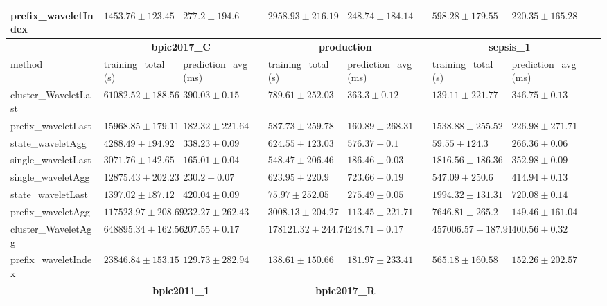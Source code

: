 \begin{table}[!htbp]
{\begin{tabular}{llllllll}
			prefix\_waveletIndex & $1453.76 \pm 123.45$ & $277.2 \pm 194.6$ & $2958.93 \pm 216.19$ & $248.74 \pm 184.14$ & $598.28 \pm 179.55$ & $220.35 \pm 165.28$ \\ 
			\bottomrule
			\toprule
			& \multicolumn{2}{c}{{\bfseries bpic2017\_C}} & \multicolumn{2}{c}{{\bfseries production}} & \multicolumn{2}{c}{{\bfseries sepsis\_1}} \\ \cmidrule(lr){2-3} \cmidrule(lr){4-5} \cmidrule(lr){6-7}
			method  & training\_total (s) & prediction\_avg (ms) & training\_total (s) & prediction\_avg (ms) & training\_total (s) & prediction\_avg (ms) \\ \midrule
			cluster\_WaveletLast & $61082.52 \pm 188.56$ & $390.03 \pm 0.15$ & $789.61 \pm 252.03$ & $363.3 \pm 0.12$ & $139.11 \pm 221.77$ & $346.75 \pm 0.13$ \\ 
			prefix\_waveletLast & $15968.85 \pm 179.11$ & $182.32 \pm 221.64$ & $587.73 \pm 259.78$ & $160.89 \pm 268.31$ & $1538.88 \pm 255.52$ & $226.98 \pm 271.71$ \\ 
			state\_waveletAgg & $4288.49 \pm 194.92$ & $338.23 \pm 0.09$ & $624.55 \pm 123.03$ & $576.37 \pm 0.1$ & $\mathbf{59.55 \pm 124.3}$ & $266.36 \pm 0.06$ \\ 
			single\_waveletLast & $3071.76 \pm 142.65$ & $165.01 \pm 0.04$ & $548.47 \pm 206.46$ & $186.46 \pm 0.03$ & $1816.56 \pm 186.36$ & $352.98 \pm 0.09$ \\ 
			single\_waveletAgg & $12875.43 \pm 202.23$ & $230.2 \pm 0.07$ & $623.95 \pm 220.9$ & $723.66 \pm 0.19$ & $547.09 \pm 250.6$ & $414.94 \pm 0.13$ \\ 
			state\_waveletLast & $\mathbf{1397.02 \pm 187.12}$ & $420.04 \pm 0.09$ & $\mathbf{75.97 \pm 252.05}$ & $275.49 \pm 0.05$ & $1994.32 \pm 131.31$ & $720.08 \pm 0.14$ \\ 
			prefix\_waveletAgg & $117523.97 \pm 208.69$ & $232.27 \pm 262.43$ & $3008.13 \pm 204.27$ & $\mathbf{113.45 \pm 221.71}$ & $7646.81 \pm 265.2$ & $\mathbf{149.46 \pm 161.04}$ \\ 
			cluster\_WaveletAgg & $648895.34 \pm 162.56$ & $207.55 \pm 0.17$ & $178121.32 \pm 244.74$ & $248.71 \pm 0.17$ & $457006.57 \pm 187.91$ & $400.56 \pm 0.32$ \\ 
			prefix\_waveletIndex & $23846.84 \pm 153.15$ & $\mathbf{129.73 \pm 282.94}$ & $138.61 \pm 150.66$ & $181.97 \pm 233.41$ & $565.18 \pm 160.58$ & $152.26 \pm 202.57$ \\ 
			\bottomrule
			\toprule
			& \multicolumn{2}{c}{{\bfseries bpic2011\_1}} & \multicolumn{2}{c}{{\bfseries bpic2017\_R}} \\ \cmidrule(lr){2-3} \cmidrule(lr){4-5} \cmidrule(lr){6-7}

\end{tabular}}
\end{table}
